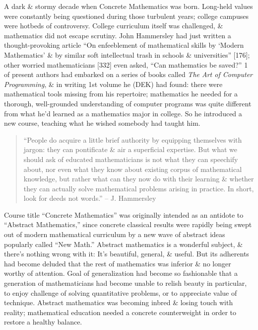\documentclass{article}
\begin{document}
\begin{enumerate}
	A dark \& stormy decade when Concrete Mathematics was born. Long-held values were constantly being questioned during those turbulent years; college campuses were hotbeds of controversy. College curriculum itself was challenged, \& mathematics did not escape scrutiny. {\sc John Hammersley} had just written a thought-provoking article ``On enfeeblement of mathematical skills by `Modern Mathematics' \& by similar soft intellectual trash in schools \& universities'' [176]; other worried mathematicians [332] even asked, ``Can mathematics be saved?'' 1 of present authors had embarked on a series of books called {\it The Art of Computer Programming}, \& in writing 1st volume he (DEK) had found: there were mathematical tools missing from his repertoire; mathematics he needed for a thorough, well-grounded understanding of computer programs was quite different from what he'd learned as a mathematics major in college. So he introduced a new course, teaching what he wished somebody had taught him.	
	\begin{quote}
		``People do acquire a little brief authority by equipping themselves with jargon: they can pontificate \& air a superficial expertise. But what we should ask of educated mathematicians is not what they can speechify about, nor even what they know about existing corpus of mathematical knowledge, but rather what can they now do with their learning \& whether they can actually solve mathematical problems arising in practice. In short, look for deeds not words.'' -- {\sc J. Hammersley}
	\end{quote}	
	Course title ``Concrete Mathematics'' was originally intended as an antidote to ``Abstract Mathematics,'' since concrete classical results were rapidly being swept out of modern mathematical curriculum by a new wave of abstract ideas popularly called ``New Math.'' Abstract mathematics is a wonderful subject, \& there's nothing wrong with it: It's beautiful, general, \& useful. But its adherents had become deluded that the rest of mathematics was inferior \& no longer worthy of attention. Goal of generalization had become so fashionable that a generation of mathematicians had become unable to relish beauty in particular, to enjoy challenge of solving quantitative problems, or to appreciate value of technique. Abstract mathematics was becoming inbred \& losing touch with reality; mathematical education needed a concrete counterweight in order to restore a healthy balance.
	

\end{enumerate}
\end{document}
